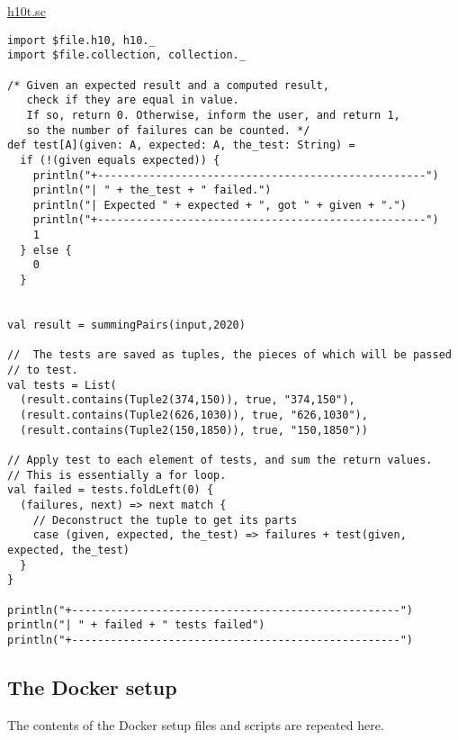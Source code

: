 \documentclass[11pt]{article}
\begin{document}
\href{./testing/h10/h10t.sc}{h10t.sc}
\begin{verbatim}
import $file.h10, h10._
import $file.collection, collection._

/* Given an expected result and a computed result,
   check if they are equal in value.
   If so, return 0. Otherwise, inform the user, and return 1,
   so the number of failures can be counted. */
def test[A](given: A, expected: A, the_test: String) =
  if (!(given equals expected)) {
    println("+---------------------------------------------------")
    println("| " + the_test + " failed.")
    println("| Expected " + expected + ", got " + given + ".")
    println("+---------------------------------------------------")
    1
  } else {
    0
  }


val result = summingPairs(input,2020)

//  The tests are saved as tuples, the pieces of which will be passed
// to test.
val tests = List(
  (result.contains(Tuple2(374,150)), true, "374,150"),
  (result.contains(Tuple2(626,1030)), true, "626,1030"),
  (result.contains(Tuple2(150,1850)), true, "150,1850"))

// Apply test to each element of tests, and sum the return values.
// This is essentially a for loop.
val failed = tests.foldLeft(0) {
  (failures, next) => next match {
    // Deconstruct the tuple to get its parts
    case (given, expected, the_test) => failures + test(given, expected, the_test)
  }
}

println("+---------------------------------------------------")
println("| " + failed + " tests failed")
println("+---------------------------------------------------")
\end{verbatim}

\subsection*{The Docker setup}
\label{sec:orga903ed9}
The contents of the Docker setup files and scripts are repeated here.
\end{document}
